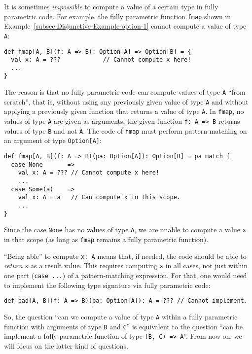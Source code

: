 It is sometimes \emph{impossible} to compute a value of a certain
type in fully parametric code. For example, the fully parametric function
\lstinline!fmap! shown in Example~\ref{subsec:Disjunctive-Example-option-1}
cannot compute a value of type \lstinline!A!:
\begin{lstlisting}
def fmap[A, B](f: A => B): Option[A] => Option[B] = {
  val x: A = ???            // Cannot compute x here!
  ...
}
\end{lstlisting}
The reason is that no fully parametric code can compute values of
type \lstinline!A! \textsf{``}from scratch\textsf{''}, that is, without using any
previously given value of type \lstinline!A! and without applying
a previously given function that returns a value of type \lstinline!A!.
In \lstinline!fmap!, no values of type \lstinline!A! are given as
arguments; the given function \lstinline!f: A => B! returns values
of type \lstinline!B! and not \lstinline!A!. The code of \lstinline!fmap!
must perform pattern matching on an argument of type \lstinline!Option[A]!:
\begin{lstlisting}
def fmap[A, B](f: A => B)(pa: Option[A]): Option[B] = pa match {
  case None       => 
    val x: A = ??? // Cannot compute x here!
    ...
  case Some(a)    =>
    val x: A = a   // Can compute x in this scope.
    ...
}
\end{lstlisting}
Since the case \lstinline!None! has no values of type \lstinline!A!,
we are unable to compute a value \lstinline!x! in that scope (as
long as \lstinline!fmap! remains a fully parametric function). 

\textsf{``}Being able\textsf{''} to compute \lstinline!x: A! means that, if needed,
the code should be able to \emph{return} \lstinline!x! as a result
value. This requires computing \lstinline!x! in all cases, not just
within one part (\lstinline!case ...!) of a pattern-matching expression.
For that, one would need  to implement the following type signature
via fully parametric code:
\begin{lstlisting}
def bad[A, B](f: A => B)(pa: Option[A]): A = ??? // Cannot implement.
\end{lstlisting}

So, the question \textsf{``}can we compute a value of type \lstinline!A!
within a fully parametric function with arguments of type \lstinline!B!
and \lstinline!C!\textsf{''} is equivalent to the question \textsf{``}can be implement
a fully parametric function of type \lstinline!(B, C) => A!\textsf{''}. From
now on, we will focus on the latter kind of questions.

